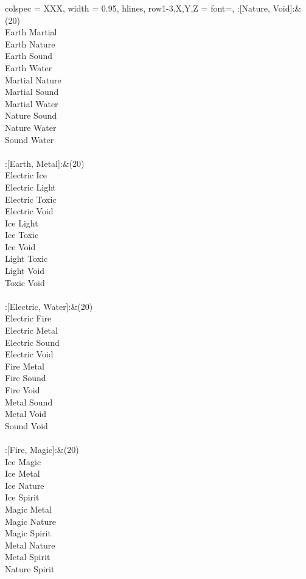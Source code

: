 \begin{longtblr}[
	caption = {2v2 Defending Resisted},
	label = {2v2-Defending-Resisted},
]{
	colspec = {XXX}, width = 0.95\linewidth,
	hlines,
	row{1-3,X,Y,Z} = {font=\bfseries},
}
	:[Nature, Void]:&{(20)\\
	Earth Martial \\
	Earth Nature \\
	Earth Sound \\
	Earth Water \\
	Martial Nature \\
	Martial Sound \\
	Martial Water \\
	Nature Sound \\
	Nature Water \\
	Sound Water \\
	}\\

	:[Earth, Metal]:&{(20)\\
	Electric Ice \\
	Electric Light \\
	Electric Toxic \\
	Electric Void \\
	Ice Light \\
	Ice Toxic \\
	Ice Void \\
	Light Toxic \\
	Light Void \\
	Toxic Void \\
	}\\

	:[Electric, Water]:&{(20)\\
	Electric Fire \\
	Electric Metal \\
	Electric Sound \\
	Electric Void \\
	Fire Metal \\
	Fire Sound \\
	Fire Void \\
	Metal Sound \\
	Metal Void \\
	Sound Void \\
	}\\

	:[Fire, Magic]:&{(20)\\
	Ice Magic \\
	Ice Metal \\
	Ice Nature \\
	Ice Spirit \\
	Magic Metal \\
	Magic Nature \\
	Magic Spirit \\
	Metal Nature \\
	Metal Spirit \\
	Nature Spirit \\
	}\\


\end{longtblr}
